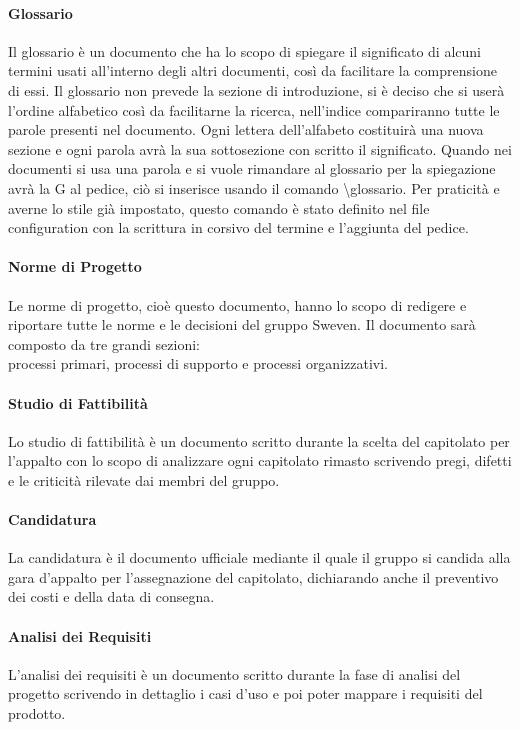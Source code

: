 \paragraph{Glossario}
Il glossario è un documento che ha lo scopo di spiegare il significato di alcuni termini usati 
all'interno degli altri documenti, così da facilitare la comprensione di essi. \newline
Il glossario non prevede la sezione di introduzione, si è deciso che si userà l'ordine alfabetico 
così da facilitarne la ricerca, nell'indice compariranno tutte le parole presenti nel documento. 
Ogni lettera dell'alfabeto costituirà una nuova sezione e ogni parola avrà la sua sottosezione 
con scritto il significato. \newline
Quando nei documenti si usa una parola e si vuole rimandare al glossario per la spiegazione 
avrà la G al pedice, ciò si inserisce usando il comando \textbackslash glossario. 
Per praticità e averne lo stile già impostato, questo comando è stato definito nel file 
configuration con la scrittura in corsivo del termine e l'aggiunta del pedice.

\paragraph{Norme di Progetto}
Le norme di progetto, cioè questo documento, hanno lo scopo di redigere e riportare tutte le norme 
e le decisioni del gruppo Sweven. Il documento sarà composto da tre grandi sezioni: \\
processi primari, processi di supporto e processi organizzativi.

\paragraph{Studio di Fattibilità}
Lo studio di fattibilità è un documento scritto durante la scelta del capitolato per l'appalto con 
lo scopo di analizzare ogni capitolato rimasto scrivendo pregi, difetti e le criticità rilevate dai 
membri del gruppo.

\paragraph{Candidatura}
La candidatura è il documento ufficiale mediante il quale il gruppo si candida alla gara d'appalto 
per l'assegnazione del capitolato, dichiarando anche il preventivo dei costi e della data di consegna.

\paragraph{Analisi dei Requisiti}
L'analisi dei requisiti è un documento scritto durante la fase di analisi del progetto scrivendo in 
dettaglio i casi d'uso e poi poter mappare i requisiti del prodotto.

